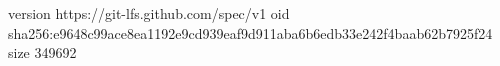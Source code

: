 version https://git-lfs.github.com/spec/v1
oid sha256:e9648c99ace8ea1192e9cd939eaf9d911aba6b6edb33e242f4baab62b7925f24
size 349692
